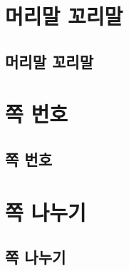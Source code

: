\documentclass[12pt,a4paper]{book}
\begin{document}
\newpage
\chapter{머리말 꼬리말}



	\newpage
	\section{머리말 꼬리말}
	
\newpage
\chapter{쪽 번호}
	
	\newpage
	\section{쪽 번호}
	
	
\newpage
\chapter{쪽 나누기}
	
	
	\newpage
	\section{쪽 나누기}
	
\end{document}

